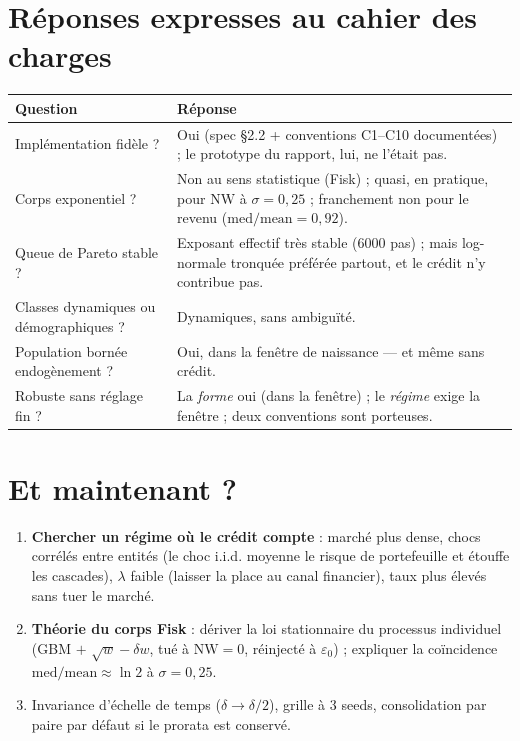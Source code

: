 \documentclass[10pt,a4paper]{article}
\newcommand{\NW}{\mathrm{NW}}
\begin{document}
\section{Réponses expresses au cahier des charges}
\renewcommand{\arraystretch}{1.35}
\begin{center}
\small
\begin{tabular}{p{7.2cm}p{7.6cm}}
\toprule
\textbf{Question} & \textbf{Réponse} \\
\midrule
Implémentation fidèle ? & Oui (spec §2.2 + conventions C1--C10 documentées) ;
le prototype du rapport, lui, ne l'était pas. \\
Corps exponentiel ? & Non au sens statistique (Fisk) ; quasi, en pratique,
pour $\NW$ à $\sigma = 0{,}25$ ; franchement non pour le revenu
($\mathrm{med}/\mathrm{mean} = 0{,}92$). \\
Queue de Pareto stable ? & Exposant effectif très stable (6000 pas) ; mais
log-normale tronquée préférée partout, et le crédit n'y contribue pas. \\
Classes dynamiques ou démographiques ? & Dynamiques, sans ambiguïté. \\
Population bornée endogènement ? & Oui, dans la fenêtre de naissance — et
même sans crédit. \\
Robuste sans réglage fin ? & La \emph{forme} oui (dans la fenêtre) ; le
\emph{régime} exige la fenêtre ; deux conventions sont porteuses. \\
\bottomrule
\end{tabular}
\end{center}

\section{Et maintenant ?}
\begin{enumerate}[leftmargin=1.6em, itemsep=3pt]
\item \textbf{Chercher un régime où le crédit compte} : marché plus dense,
  chocs corrélés entre entités (le choc i.i.d. moyenne le risque de
  portefeuille et étouffe les cascades), $\lambda$ faible (laisser la place
  au canal financier), taux plus élevés sans tuer le marché.
\item \textbf{Théorie du corps Fisk} : dériver la loi stationnaire du
  processus individuel (GBM $+$ $\sqrt{w} - \delta w$, tué à $\NW = 0$,
  réinjecté à $\varepsilon_0$) ; expliquer la coïncidence
  $\mathrm{med}/\mathrm{mean} \approx \ln 2$ à $\sigma = 0{,}25$.
\item Invariance d'échelle de temps ($\delta \to \delta/2$), grille à 3
  seeds, consolidation par paire par défaut si le prorata est conservé.
\end{enumerate}
\end{document}
